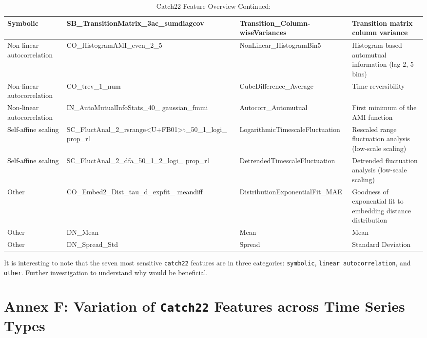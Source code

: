 \documentclass{article}
\begin{document}
\begin{table}[H]

\caption{\label{tab:unnamed-chunk-23}Catch22 Feature Overview Continued: }
\centering
\begin{tabular}[t]{>{\raggedright\arraybackslash}p{0.7in}|>{\raggedright\arraybackslash}p{2.3in}|>{\raggedright\arraybackslash}p{2.1in}|>{\raggedright\arraybackslash}p{1in}}
\hline
Symbolic & SB\_TransitionMatrix\_3ac\_sumdiagcov & Transition\_Column-wiseVariances & Transition matrix column variance\\
\hline
Non-linear autocorrelation & CO\_HistogramAMI\_even\_2\_5 & NonLinear\_HistogramBin5 & Histogram-based automutual information (lag 2, 5 bins)\\
\hline
Non-linear autocorrelation & CO\_trev\_1\_num & CubeDifference\_Average & Time reversibility\\
\hline
Non-linear autocorrelation & IN\_AutoMutualInfoStats\_40\_ gaussian\_fmmi & Autocorr\_Automutual & First minimum of the AMI function\\
\hline
Self-affine scaling & SC\_FluctAnal\_2\_rsrange<U+FB01>t\_50\_1\_logi\_ prop\_r1 & LogarithmicTimescaleFluctuation & Rescaled range fluctuation analysis (low-scale scaling)\\
\hline
Self-affine scaling & SC\_FluctAnal\_2\_dfa\_50\_1\_2\_logi\_ prop\_r1 & DetrendedTimescaleFluctuation & Detrended fluctuation analysis (low-scale scaling)\\
\hline
Other & CO\_Embed2\_Dist\_tau\_d\_expfit\_ meandiff & DistributionExponentialFit\_MAE & Goodness of exponential fit to embedding distance distribution\\
\hline
Other & DN\_Mean & Mean & Mean\\
\hline
Other & DN\_Spread\_Std & Spread & Standard Deviation\\
\hline
\end{tabular}
\end{table}

It is interesting to note that the seven most sensitive \texttt{catch22}
features are in three categories: \texttt{symbolic},
\texttt{linear\ autocorrelation}, and \texttt{other}. Further
investigation to understand why would be beneficial.

\newpage

\hypertarget{annex-f-variation-of-catch22-features-across-time-series-types}{%
\section{\texorpdfstring{Annex F: Variation of \texttt{Catch22} Features
across Time Series
Types}{Annex F: Variation of Catch22 Features across Time Series Types}}\label{annex-f-variation-of-catch22-features-across-time-series-types}}
\end{document}
